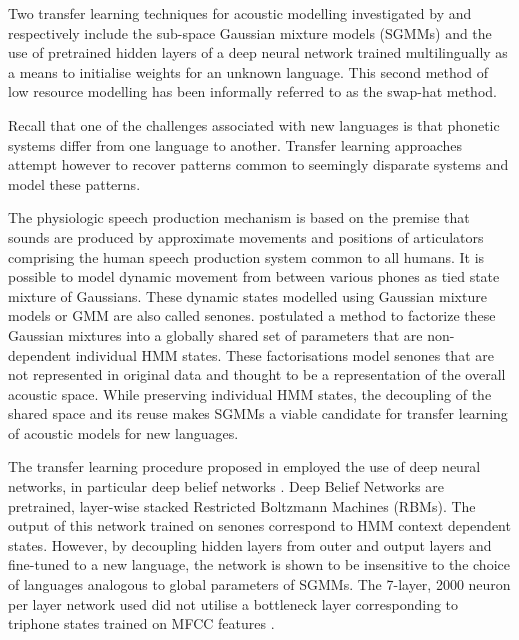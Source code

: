 Two transfer learning techniques for acoustic modelling investigated by \cite{povey2011subspace} and \cite{ghoshal2013multilingual} respectively include the sub-space Gaussian mixture models (SGMMs) and the use of pretrained hidden layers of a deep neural network trained multilingually as a means to initialise weights for an unknown language.  This second method of low resource modelling has been informally referred to as the swap-hat method.

Recall that one of the challenges associated with new languages is that phonetic systems differ from one language to another.  Transfer learning approaches attempt however to recover patterns common to seemingly disparate systems and model these patterns.  

The physiologic speech production mechanism is based on the premise that sounds are produced by approximate movements and positions of articulators comprising the human speech production system common to all humans.  It is possible to model dynamic movement from between various phones as tied state mixture of Gaussians. These dynamic states modelled using Gaussian mixture models or GMM are also called senones. \cite{povey2011subspace} postulated a method to factorize these Gaussian mixtures into a globally shared set of parameters that are non-dependent individual HMM states.  These factorisations model senones that are not represented in original data and thought to be a representation of the overall acoustic space.  While preserving individual HMM states, the decoupling of the shared space and its reuse makes SGMMs a viable candidate for transfer learning of acoustic models for new languages.

The transfer learning procedure proposed in \cite{ghoshal2013multilingual} employed the use of deep neural networks, in particular deep belief networks \citep{bengio2007greedy}.  Deep Belief Networks are pretrained, layer-wise  stacked Restricted Boltzmann Machines (RBMs)\citep{smolensky1986information}.  The output of this network trained on senones correspond to HMM context dependent states.  However, by decoupling hidden layers from outer and output layers and fine-tuned to a new language, the network is shown to be insensitive to the choice of languages analogous to global parameters of SGMMs. The 7-layer, 2000 neuron per layer network used did not utilise a bottleneck layer corresponding to triphone states trained on MFCC features \citep{grezl2008optimizing}.

